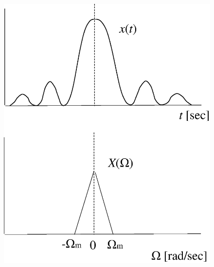 \begin{figure}[b]
\begin{center}
\begin{minipage}{.35\textwidth}
\begin{center}
\includegraphics[width=.98\textwidth]{fig/zu-4-19-a.eps}


\end{center}
\end{minipage}
\end{center}
\end{figure}
